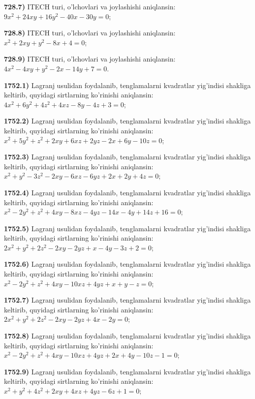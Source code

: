 \textbf{728.7)} ITECH turi, o'lchovlari va joylashishi aniqlansin: \(9x^{2} + 24xy + 16y^{2} - 40x - 30y = 0\);

\textbf{728.8)} ITECH turi, o'lchovlari va joylashishi aniqlansin: \(x^{2} + 2xy + y^{2} - 8x + 4 = 0\);

\textbf{728.9)} ITECH turi, o'lchovlari va joylashishi aniqlansin: \(4x^{2} - 4xy + y^{2} - 2x - 14y + 7 = 0\).

\textbf{1752.1)} Lagranj usulidan foydalanib, tenglamalarni kvadratlar yig'indisi shakliga keltirib, quyidagi sirtlarning ko'rinishi aniqlansin: \(4x^{2} + 6y^{2} + 4z^{2} + 4xz - 8y - 4z + 3 = 0\);

\textbf{1752.2)} Lagranj usulidan foydalanib, tenglamalarni kvadratlar yig'indisi shakliga keltirib, quyidagi sirtlarning ko'rinishi aniqlansin: \(x^{2} + 5y^{2} + z^{2} + 2xy + 6xz + 2yz - 2x + 6y - 10z = 0\);

\textbf{1752.3)} Lagranj usulidan foydalanib, tenglamalarni kvadratlar yig'indisi shakliga keltirib, quyidagi sirtlarning ko'rinishi aniqlansin: \(x^{2} + y^{2} - 3z^{2} - 2xy - 6xz - 6yz + 2x + 2y + 4z = 0\);

\textbf{1752.4)} Lagranj usulidan foydalanib, tenglamalarni kvadratlar yig'indisi shakliga keltirib, quyidagi sirtlarning ko'rinishi aniqlansin: \(x^{2} - 2y^{2} + z^{2} + 4xy - 8xz - 4yz - 14x - 4y + 14z + 16 = 0\);

\textbf{1752.5)} Lagranj usulidan foydalanib, tenglamalarni kvadratlar yig'indisi shakliga keltirib, quyidagi sirtlarning ko'rinishi aniqlansin: \(2x^{2} + y^{2} + 2z^{2} - 2xy - 2yz + x - 4y - 3z + 2 = 0\);

\textbf{1752.6)} Lagranj usulidan foydalanib, tenglamalarni kvadratlar yig'indisi shakliga keltirib, quyidagi sirtlarning ko'rinishi aniqlansin: \(x^{2} - 2y^{2} + z^{2} + 4xy - 10xz + 4yz + x + y - z = 0\);

\textbf{1752.7)} Lagranj usulidan foydalanib, tenglamalarni kvadratlar yig'indisi shakliga keltirib, quyidagi sirtlarning ko'rinishi aniqlansin: \(2x^{2} + y^{2} + 2z^{2} - 2xy - 2yz + 4x - 2y = 0\);

\textbf{1752.8)} Lagranj usulidan foydalanib, tenglamalarni kvadratlar yig'indisi shakliga keltirib, quyidagi sirtlarning ko'rinishi aniqlansin: \(x^{2} - 2y^{2} + z^{2} + 4xy - 10xz + 4yz + 2x + 4y - 10z - 1 = 0\);

\textbf{1752.9)} Lagranj usulidan foydalanib, tenglamalarni kvadratlar yig'indisi shakliga keltirib, quyidagi sirtlarning ko'rinishi aniqlansin: \(x^{2} + y^{2} + 4z^{2} + 2xy + 4xz + 4yz - 6z + 1 = 0\);

